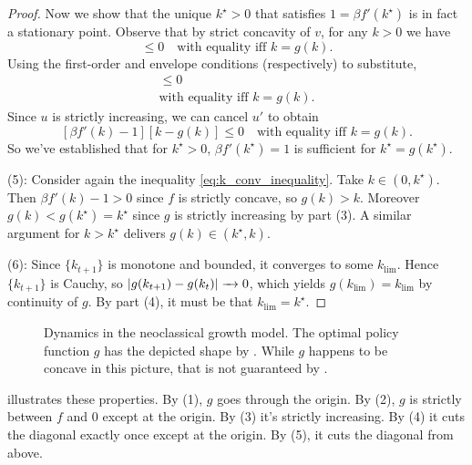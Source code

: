 \documentclass[11pt,letterpaper,reqno,oneside]{article}
\begin{document}
\begin{proof}
	Now we show that the unique $k^\star>0$ that satisfies $1=\beta f'(k^\star)$ is in fact a stationary point. Observe that by strict concavity of $v$, for any $k>0$ we have
	\begin{equation*}
		[ v'(k) - v'(g(k)) ] [ k - g(k) ] \leq 0
		\quad\text{with equality iff $k=g(k)$} .
	\end{equation*}
	Using the first-order and envelope conditions (respectively) to substitute,
	\begin{multline*}
		[ u'(f(k)-g(k))f'(k) - \beta^{-1} u'(f(k)-g(k)) ] [ k - g(k) ] \leq 0
		\\
		\text{with equality iff $k=g(k)$} .
	\end{multline*}
	Since $u$ is strictly increasing, we can cancel $u'$ to obtain
	\begin{equation}
		\label{eq:k_conv_inequality}
		[ \beta f'(k) - 1 ] [ k - g(k) ] \leq 0
		\quad\text{with equality iff $k=g(k)$} .
	\end{equation}
	So we've established that for $k^\star>0$, $\beta f'(k^\star) = 1$ is sufficient for $k^\star = g(k^\star)$.
	
	(5): Consider again the inequality \eqref{eq:k_conv_inequality}. Take $k\in(0,k^\star)$. Then $\beta f'(k) - 1 > 0$ since $f$ is strictly concave, so $g(k)>k$. Moreover $g(k) < g(k^\star) = k^\star$ since $g$ is strictly increasing by part (3). A similar argument for $k>k^\star$ delivers $g(k) \in (k^\star,k)$.

	(6): Since $\{ k_{t+1} \}$ is monotone and bounded, it converges to some $k_\text{lim}$. Hence $\{ k_{t+1} \}$ is Cauchy, so $\abs*{ g(k_{t+1}) - g(k_t) } \conv 0$, which yields $g(k_\text{lim})=k_\text{lim}$ by continuity of $g$.
	By part (4), it must be that $k_\text{lim} = k^\star$.
\end{proof}


\begin{figure}
	\centering
	
	\caption{Dynamics in the neoclassical growth model. The optimal policy function $g$ has the depicted shape by . While $g$ happens to be concave in this picture, that is not guaranteed by .}
	\label{fig:neoclassical_general_dynamics}
\end{figure}
%
 illustrates these properties. By (1), $g$ goes through the origin. By (2), $g$ is strictly between $f$ and $0$ except at the origin. By (3) it's strictly increasing. By (4) it cuts the diagonal exactly once except at the origin. By (5), it cuts the diagonal from above.
\end{document}
